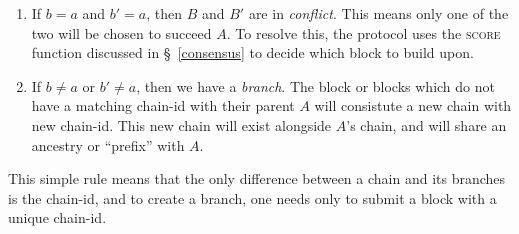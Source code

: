 \begin{enumerate}
    \item If $b = a$ and $b' = a$, then $B$ and $B'$ are in \emph{conflict}.
        This means only one of the two will be chosen to succeed $A$. To
        resolve this, the protocol uses the \textsc{score} function discussed
        in \S~\ref{consensus} to decide which block to build upon.
    \item If $b \neq a$ or $b' \neq a$, then we have a \emph{branch}. The block
        or blocks which do not have a matching chain-id with their parent $A$
        will consistute a new chain with new chain-id. This new chain will
        exist alongside $A$'s chain, and will share an ancestry or ``prefix''
        with $A$.
\end{enumerate}

This simple rule means that the only difference between a chain and its branches
is the chain-id, and to create a branch, one needs only to submit a block with
a unique chain-id.

 \\
 \\
 \\


